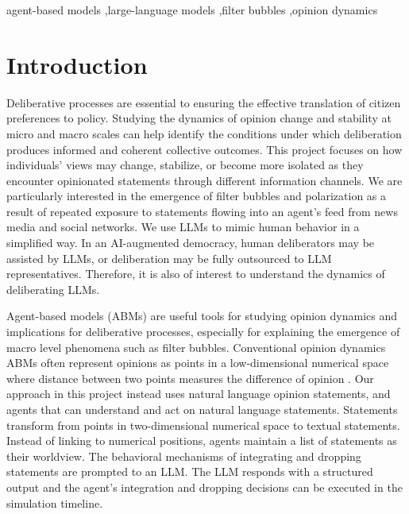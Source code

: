 \documentclass[]{ceurart}
\begin{document}
\begin{keywords}
agent-based models \sep large-language models \sep filter
bubbles \sep opinion dynamics
\end{keywords}

\maketitle

\section{Introduction}\label{introduction}

Deliberative processes are essential to ensuring the effective
translation of citizen preferences to policy. Studying the dynamics of
opinion change and stability at micro and macro scales can help identify
the conditions under which deliberation produces informed and coherent
collective outcomes. This project focuses on how individuals' views may
change, stabilize, or become more isolated as they encounter opinionated
statements through different information channels. We are particularly
interested in the emergence of filter bubbles and polarization as a
result of repeated exposure to statements flowing into an agent's feed
from news media and social networks. We use LLMs to mimic human behavior
in a simplified way. In an AI-augmented democracy, human deliberators
may be assisted by LLMs, or deliberation may be fully outsourced to LLM
representatives. Therefore, it is also of interest to understand the
dynamics of deliberating LLMs.

Agent-based models (ABMs) are useful tools for studying opinion dynamics
and implications for deliberative processes, especially for explaining
the emergence of macro level phenomena such as filter bubbles.
Conventional opinion dynamics ABMs often represent opinions as points in
a low-dimensional numerical space where distance between two points
measures the difference of opinion
\citet{GeschkeEtAl2019TriplefilterBubbleUsing}. Our approach in this
project instead uses natural language opinion statements, and agents
that can understand and act on natural language statements. Statements
transform from points in two-dimensional numerical space to textual
statements. Instead of linking to numerical positions, agents maintain a
list of statements as their worldview. The behavioral mechanisms of
integrating and dropping statements are prompted to an LLM. The LLM
responds with a structured output and the agent's integration and
dropping decisions can be executed in the simulation timeline.
\end{document}
